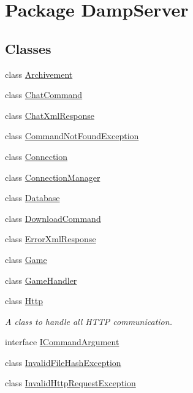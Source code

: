 \hypertarget{namespace_damp_server}{\section{Package Damp\-Server}
\label{namespace_damp_server}
}
\subsection*{Classes}
\begin{DoxyCompactItemize}
\item 
class \hyperlink{class_damp_server_1_1_archivement}{Archivement}
\item 
class \hyperlink{class_damp_server_1_1_chat_command}{Chat\-Command}
\item 
class \hyperlink{class_damp_server_1_1_chat_xml_response}{Chat\-Xml\-Response}
\item 
class \hyperlink{class_damp_server_1_1_command_not_found_exception}{Command\-Not\-Found\-Exception}
\item 
class \hyperlink{class_damp_server_1_1_connection}{Connection}
\item 
class \hyperlink{class_damp_server_1_1_connection_manager}{Connection\-Manager}
\item 
class \hyperlink{class_damp_server_1_1_database}{Database}
\item 
class \hyperlink{class_damp_server_1_1_download_command}{Download\-Command}
\item 
class \hyperlink{class_damp_server_1_1_error_xml_response}{Error\-Xml\-Response}
\item 
class \hyperlink{class_damp_server_1_1_game}{Game}
\item 
class \hyperlink{class_damp_server_1_1_game_handler}{Game\-Handler}
\item 
class \hyperlink{class_damp_server_1_1_http}{Http}
\begin{DoxyCompactList}\small\item\em A class to handle all H\-T\-T\-P communication. \end{DoxyCompactList}\item 
interface \hyperlink{interface_damp_server_1_1_i_command_argument}{I\-Command\-Argument}
\item 
class \hyperlink{class_damp_server_1_1_invalid_file_hash_exception}{Invalid\-File\-Hash\-Exception}
\item 
class \hyperlink{class_damp_server_1_1_invalid_http_request_exception}{Invalid\-Http\-Request\-Exception}

\end{DoxyCompactItemize}
